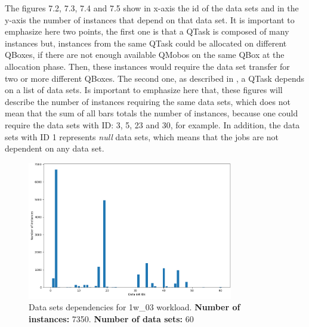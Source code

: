 The figures 7.2, 7.3, 7.4 and 7.5 show in x-axis the id of the data sets and in the y-axis the number of instances that depend on that data set. It is important to emphasize here two points, the first one is that a QTask is composed of many instances but, instances from the same QTask could be allocated on different QBoxes, if there are not enough available QMobos on the same QBox at the allocation phase. Then, these instances would require the data set transfer for two or more different QBoxes.
The second one, as described in , a QTask depends on a list of data sets.
Is important to emphasize here that, these figures will describe the number of instances requiring the same data sets, which does not mean that the sum of all bars totals the number of instances, because one could require the data sets with ID: 3, 5, 23 and 30, for example. In addition, the data sets with ID 1 represents \textit{null} data sets, which means that the jobs are not dependent on any data set. \\

\begin{figure} [H]
    \centering
    \includegraphics[width=0.8\textwidth]{images/experiments/datasets/1w_03-05-2019_data_sets_dependencies.png}
    \captionsetup{justification=centering,margin=3cm}
    \caption{Data sets dependencies for 1w\_03 workload. \textbf{Number of instances:} 7350. \textbf{Number of data sets:} 60}
    \label{fig:datasets-dependencies-1w_03}
\end{figure}

